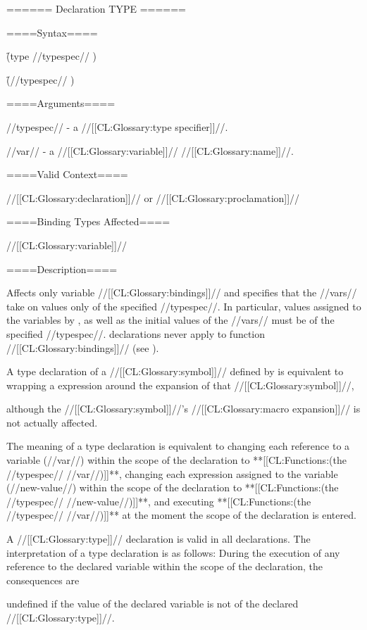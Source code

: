 ====== Declaration TYPE ======

====Syntax====

\f{(type //typespec// )}

\f{(//typespec// )}

====Arguments====

//typespec// - a //[[CL:Glossary:type specifier]]//.

//var// - a //[[CL:Glossary:variable]]// //[[CL:Glossary:name]]//.

====Valid Context====

//[[CL:Glossary:declaration]]// or //[[CL:Glossary:proclamation]]//

====Binding Types Affected====

//[[CL:Glossary:variable]]//

====Description====

Affects only variable //[[CL:Glossary:bindings]]// and specifies that the //vars// take on values only of the specified //typespec//. In particular, values assigned to the variables by , as well as the initial values of the //vars// must be of the specified //typespec//.  declarations never apply to function //[[CL:Glossary:bindings]]// (see ).

A type declaration of a //[[CL:Glossary:symbol]]// defined by  is equivalent to wrapping a  expression around the expansion of that //[[CL:Glossary:symbol]]//,

although the //[[CL:Glossary:symbol]]//'s //[[CL:Glossary:macro expansion]]// is not actually affected.

The meaning of a type declaration is equivalent to changing each reference to a variable (//var//) within the scope of the declaration to **[[CL:Functions:(the //typespec// //var//)]]**, changing each expression assigned to the variable (//new-value//) within the scope of the declaration to **[[CL:Functions:(the //typespec// //new-value//)]]**, and executing **[[CL:Functions:(the //typespec// //var//)]]** at the moment the scope of the declaration is entered.

A //[[CL:Glossary:type]]// declaration is valid in all declarations. The interpretation of a type declaration is as follows: \beginlist {} During the execution of any reference to the declared variable within the scope of the declaration, the consequences are

undefined if the value of the declared variable is not of the declared //[[CL:Glossary:type]]//.

